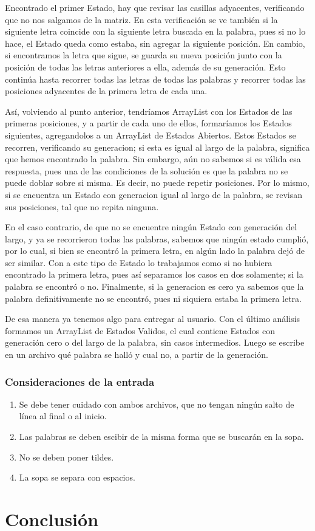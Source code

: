 \documentclass{article}
\begin{document}
    Encontrado el primer Estado, hay que revisar las casillas adyacentes, verificando
    que no nos salgamos de la matriz. En esta verificación se ve también si la siguiente
    letra coincide con la siguiente letra buscada en la palabra, pues si no lo hace,
    el Estado queda como estaba, sin agregar la siguiente posición. En cambio, si
    encontramos la letra que sigue, se guarda su nueva posición junto con la posición
    de todas las letras anteriores a ella, además de su generación. Esto continúa
    hasta recorrer todas las letras de todas las palabras y recorrer todas las
    posiciones adyacentes de la primera letra de cada una.

    Así, volviendo al punto anterior, tendríamos ArrayList con los Estados de las
    primeras posiciones, y a partir de cada uno de ellos, formaríamos los Estados
    siguientes, agregandolos a un ArrayList de Estados Abiertos. Estos Estados se
    recorren, verificando su generacion; si esta es igual al largo de la palabra,
    significa que hemos encontrado la palabra. Sin embargo, aún no sabemos si es
    válida esa respuesta, pues una de las condiciones de la solución es que la palabra
    no se puede doblar sobre si misma. Es decir, no puede repetir posiciones. Por
    lo mismo, si se encuentra un Estado con generacion igual al largo de la palabra,
    se revisan sus posiciones, tal que no repita ninguna.

    En el caso contrario, de que no se encuentre ningún Estado con generación del
    largo, y ya se recorrieron todas las palabras, sabemos que ningún estado cumplió,
    por lo cual, si bien se encontró la primera letra, en algún lado la palabra dejó
    de ser similar. Con a este tipo de Estado lo trabajamos como si no hubiera
    encontrado la primera letra, pues así separamos los casos en dos solamente;
    si la palabra se encontró o no.
    Finalmente, si la generacion es cero ya sabemos que la palabra definitivamente
    no se encontró, pues ni siquiera estaba la primera letra.

    De esa manera ya tenemos algo para entregar al usuario. Con el último análisis
    formamos un ArrayList de Estados Validos, el cual contiene Estados con generación
    cero o del largo de la palabra, sin casos intermedios. Luego se escribe en un
    archivo qué palabra se halló y cual no, a partir de la generación.

    \subsubsection{Consideraciones de la entrada}
    \begin{enumerate}
      \item Se debe tener cuidado con ambos archivos, que no tengan ningún salto de
      línea al final o al inicio.
      \item Las palabras se deben escibir de la misma forma que se buscarán en
      la sopa.
      \item No se deben poner tildes.
      \item La sopa se separa con espacios.
    \end{enumerate}


  \section{Conclusión}
\end{document}
